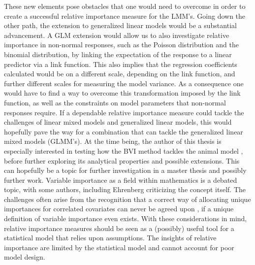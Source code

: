 These new elements pose obstacles that one would need to overcome in order to create a successful relative importance measure for the LMM's.
\newline
\newline
Going down the other path, the extension to generalized linear models would be a substantial advancement.
A GLM extension would allow us to also investigate relative importance in non-normal responses, such as the Poisson distribution and the binomial distribution, by linking the expectation of the response to a linear predictor via a link function.
This also implies that the regression coefficients calculated would be on a different scale, depending on the link function, and further different scales for measuring the model variance. 
As a consequence one would have to find a way to overcome this transformation imposed by the link function, as well as the constraints on model parameters that non-normal responses require. 
If a dependable relative importance measure could tackle the challenges of linear mixed models and generalized linear models, this would hopefully pave the way for a combination that can tackle the generalized linear mixed models (GLMM's).
\newline
\newline
At the time being, the author of this thesis is especially interested in testing how the BVI method tackles the animal model \citep{Kruuk2004}, before further exploring its analytical properties and possible extensions.
This can hopefully be a topic for further investigation in a master thesis and possibly further work. 
\newline
\newline
Variable importance as a field within mathematics is a debated topic, with some authors, including Ehrenberg \citep{Gromping_2015} criticizing the concept itself. 
The challenges often arise from the recognition that a correct way of allocating unique importances for correlated covariates can never be agreed upon \citep{Gromping_2015}, if a unique definition of variable importance even exists.
With these considerations in mind, relative importance measures should be seen as a (possibly) useful tool for a statistical model that relies upon assumptions. 
The insights of relative importance are limited by the statistical model and cannot account for poor model design.


